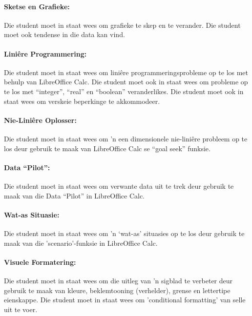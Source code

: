             \paragraph{Sketse en Grafieke:}
                Die student moet in staat wees om grafieke te skep en te verander.
                Die student moet ook tendense in die data kan vind.          

            \paragraph{Lini\^{e}re Programmering:}
                Die student moet in staat wees om lini\^{e}re programmeringsprobleme
                op te los met behulp van LibreOffice Calc. Die student
                moet ook in staat wees om probleme op te los met ``integer'', ``real''
                en ``boolean'' veranderlikes.  Die student moet ook in staat wees om 
                verskeie beperkinge te akkommodeer.

            \paragraph{Nie-Lini\^{e}re Oplosser:}
                Die student moet in staat wees om 'n een dimensionele nie-lini\^{e}re 
                probleem op te los deur gebruik te maak van LibreOffice Calc se 
                ``goal seek'' funksie.

            \paragraph{Data ``Pilot'':}
		Die student moet in staat wees om verwante data uit te trek 
		deur gebruik te maak van die Data ``Pilot'' in LibreOffice Calc.

            \paragraph{Wat-as Situasie:}
                Die student moet in staat wees om 'n `wat-as' situasies op te los 
                deur gebruik te maak van die 'scenario'-funksie  in LibreOffice Calc.

            \paragraph{Visuele Formatering:}
                Die student moet in staat wees om die uitleg van 'n sigblad te verbeter
                deur gebruik te maak van kleure, beklemtooning (verhelder), grense en lettertipe
                eienskappe.  Die student moet in staat wees om 'conditional formatting' 
                van selle uit te voer.
        
